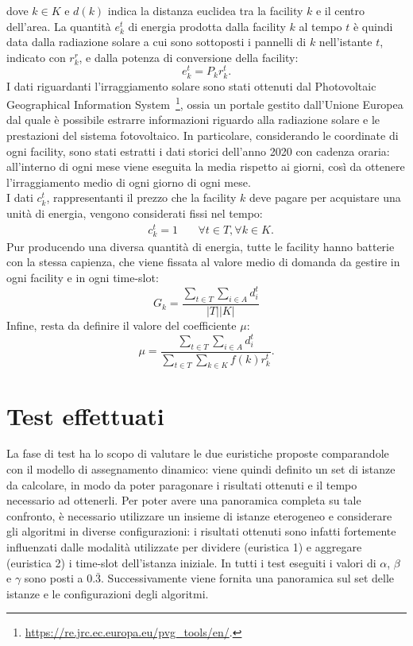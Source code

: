 dove $k \in K$ e $d(k)$ indica la distanza euclidea tra la facility $k$ e il centro dell'area.
La quantità $e^t_k$ di energia prodotta dalla facility $k$ al tempo $t$ è quindi data dalla radiazione solare a cui sono sottoposti i pannelli di $k$ nell'istante $t$, indicato con $r^r_k$, e dalla potenza di conversione della facility:
\begin{equation}
    e^t_k = P_k r^t_k.
\end{equation}
I dati riguardanti l'irraggiamento solare sono stati ottenuti dal Photovoltaic Geographical Information System~\footnote{\url{https://re.jrc.ec.europa.eu/pvg_tools/en/}.}, ossia un portale gestito dall'Unione Europea dal quale è possibile estrarre informazioni riguardo alla radiazione solare e le prestazioni del sistema fotovoltaico. In particolare, considerando le coordinate di ogni facility, sono stati estratti i dati storici dell'anno 2020 con cadenza oraria: all'interno di ogni mese viene eseguita la media rispetto ai giorni, così da ottenere l'irraggiamento medio di ogni giorno di ogni mese.\\
I dati $c^t_k$, rappresentanti il prezzo che la facility $k$ deve pagare per acquistare una unità di energia, vengono considerati fissi nel tempo:
\begin{align}
    &c^t_k = 1 & & ~ \forall t \in T, \forall k \in K.
\end{align}
Pur producendo una diversa quantità di energia, tutte le facility hanno batterie con la stessa capienza, che viene fissata al valore medio di domanda da gestire in ogni facility e in ogni time-slot:
\begin{equation}
    G_k = \frac{\sum_{t \in T} \sum_{i \in A} d^t_i}{|T||K|}
\end{equation}
Infine, resta da definire il valore del coefficiente $\mu$:
\begin{equation}
    \mu = \frac{\sum_{t \in T} \sum_{i \in A} d^t_i}{\sum_{t \in T} \sum_{k \in K} f(k)r^t_k}.
\end{equation}

\section{Test effettuati}

La fase di test ha lo scopo di valutare le due euristiche proposte comparandole con il modello di assegnamento dinamico: viene quindi definito un set di istanze da calcolare, in modo da poter paragonare i risultati ottenuti e il tempo necessario ad ottenerli. Per poter avere una panoramica completa su tale confronto, è necessario utilizzare un insieme di istanze eterogeneo e considerare gli algoritmi in diverse configurazioni: i risultati ottenuti sono infatti fortemente influenzati dalle modalità utilizzate per dividere (euristica 1) e aggregare (euristica 2) i time-slot dell'istanza iniziale. In tutti i test eseguiti i valori di $\alpha$, $\beta$ e $\gamma$ sono posti a $0.\bar{3}$. Successivamente viene fornita una panoramica sul set delle istanze e le configurazioni degli algoritmi.

